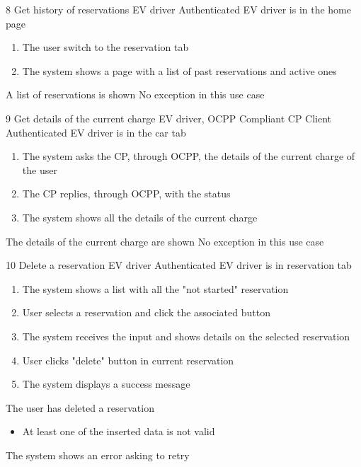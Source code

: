 \usecase
{8}
{Get history of reservations}
{EV driver}
{Authenticated EV driver is in the home page}
{
    \begin{enumerate}
        \item The user switch to the reservation tab
        \item The system shows a page with a list of past reservations and active ones
    \end{enumerate}
}
{A list of reservations is shown}
{
    No exception in this use case
}
{
}

\usecase
{9}
{Get details of the current charge}
{EV driver, OCPP Compliant CP Client}
{Authenticated EV driver is in the car tab}
{
    \begin{enumerate}
        \item The system asks the CP, through OCPP, the details of the current charge of the user
        \item The CP replies, through OCPP, with the status
        \item The system shows all the details of the current charge
    \end{enumerate}
}
{The details of the current charge are shown}
{
    No exception in this use case
}
{
}

\usecase
{10}
{Delete a reservation}
{EV driver}
{Authenticated EV driver is in reservation tab}
{
    \begin{enumerate}
        \item The system shows a list with all the "not started" reservation
        \item User selects a reservation and click the associated button
        \item The system receives the input and shows details on the selected reservation
        \item User clicks "delete" button in current reservation
        \item The system displays a success message
    \end{enumerate}
}
{The user has deleted a reservation}
{
    \begin{itemize}
        \item At least one of the inserted data is not valid
    \end{itemize}
}
{
    The system shows an error asking to retry
}


